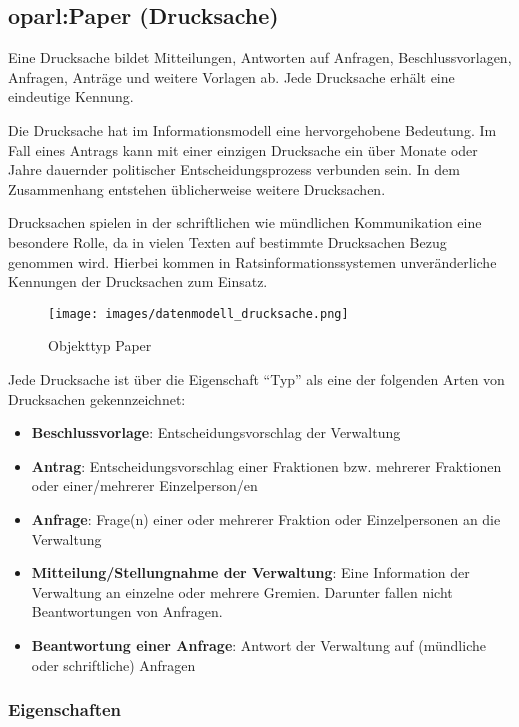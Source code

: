 \documentclass[,a4paper]{article}
\makeatletter
\def\maxwidth{\ifdim\Gin@nat@width>\linewidth\linewidth
\else\Gin@nat@width\fi}
\let\Oldincludegraphics\includegraphics
\renewcommand{\includegraphics}[1]{\Oldincludegraphics[width=\maxwidth]{#1}}
\makeatother
\begin{document}
\subsection{oparl:Paper (Drucksache)}

Eine Drucksache bildet Mitteilungen, Antworten auf Anfragen,
Beschlussvorlagen, Anfragen, Anträge und weitere Vorlagen ab. Jede
Drucksache erhält eine eindeutige Kennung.

Die Drucksache hat im Informationsmodell eine hervorgehobene Bedeutung.
Im Fall eines Antrags kann mit einer einzigen Drucksache ein über Monate
oder Jahre dauernder politischer Entscheidungsprozess verbunden sein. In
dem Zusammenhang entstehen üblicherweise weitere Drucksachen.

Drucksachen spielen in der schriftlichen wie mündlichen Kommunikation
eine besondere Rolle, da in vielen Texten auf bestimmte Drucksachen
Bezug genommen wird. Hierbei kommen in Ratsinformationssystemen
unveränderliche Kennungen der Drucksachen zum Einsatz.

\begin{figure}[htbp]
\centering
\texttt{[image: images/datenmodell\_drucksache.png]}
\caption{Objekttyp Paper}
\end{figure}

Jede Drucksache ist über die Eigenschaft ``Typ'' als eine der folgenden
Arten von Drucksachen gekennzeichnet:

\begin{itemize}
\item
  \textbf{Beschlussvorlage}: Entscheidungsvorschlag der Verwaltung
\item
  \textbf{Antrag}: Entscheidungsvorschlag einer Fraktionen bzw. mehrerer
  Fraktionen oder einer/mehrerer Einzelperson/en
\item
  \textbf{Anfrage}: Frage(n) einer oder mehrerer Fraktion oder
  Einzelpersonen an die Verwaltung
\item
  \textbf{Mitteilung/Stellungnahme der Verwaltung}: Eine Information der
  Verwaltung an einzelne oder mehrere Gremien. Darunter fallen nicht
  Beantwortungen von Anfragen.
\item
  \textbf{Beantwortung einer Anfrage}: Antwort der Verwaltung auf
  (mündliche oder schriftliche) Anfragen
\end{itemize}

\subsubsection{Eigenschaften}
\end{document}
